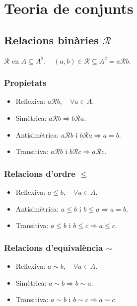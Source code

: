 \section{Teoria de conjunts}
\subsection{Relacions binàries $\mathcal{R}$}
$\mathcal{R}$ en $A \subseteq A^{2}, \quad (a,b) \in \mathcal{R} \subseteq A^{2} = a \mathcal{R} b$.
\subsubsection*{Propietats}
\begin{itemize}
    \item Reflexiva: $a \mathcal{R} b, \quad \forall a \in A$.
    \item Simètrica: $a \mathcal{R} b \Rightarrow b \mathcal{R} a$.
    \item Antisimètrica: $a \mathcal{R} b$ i $b \mathcal{R} a \Rightarrow a = b$.
    \item Transitiva: $a \mathcal{R} b$ i $b \mathcal{R} c \Rightarrow a \mathcal{R} c$.
\end{itemize}

\subsubsection*{Relacions d'ordre $\leq$}
\begin{itemize}
    \item Reflexiva: $a \leq b, \quad \forall a \in A$.
    \item Antisimètrica: $a \leq b$ i $b \leq a \Rightarrow a = b$.
    \item Transitiva: $a \leq b$ i $b \leq c \Rightarrow a \leq c$.
\end{itemize}

\subsubsection*{Relacions d'equivalència $\sim$}
\begin{itemize}
    \item Reflexiva: $a \sim b, \quad \forall a \in A$.
    \item Simètrica: $a \sim b \Rightarrow b \sim a$.
    \item Transitiva: $a \sim b$ i $b \sim c \Rightarrow a \sim c$.
\end{itemize}

